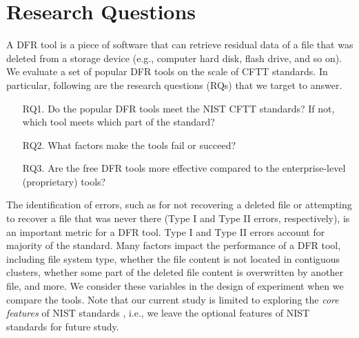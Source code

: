 \section{Research Questions}

A DFR tool is a piece of software that can retrieve residual data of a file that was deleted 
from a storage device (e.g., computer hard disk, flash drive, and so on). We evaluate a set of 
popular DFR tools on the scale of CFTT standards. 
In particular, following are the research questions (RQs) that we target to answer. 

\begin{itemize}
\item[RQ1.] Do the popular DFR tools meet the NIST CFTT standards? 
If not, which tool meets which part of the standard? 

\item[RQ2.] What factors make the tools fail or succeed?

\item[RQ3.] Are the free DFR tools more effective compared to the enterprise-level (proprietary) tools?
\end{itemize}

The identification of errors, such as for not recovering a deleted file or attempting to recover a file that was never there 
(Type I and Type II errors, respectively), is an important metric for a DFR tool. 
Type I and Type II errors account for majority of the standard. Many factors impact the performance of a DFR tool, 
including file system type, whether the file content is not located in contiguous clusters, whether 
some part of the deleted file content is overwritten by another file, and more.
We consider these variables in the design of experiment when we compare the tools.
Note that our current study is limited to exploring the \emph{core features} of NIST standards \cite{meta:dfr:standards}, 
i.e., we leave the optional features \cite{meta:dfr:standards} of NIST standards for future study.

